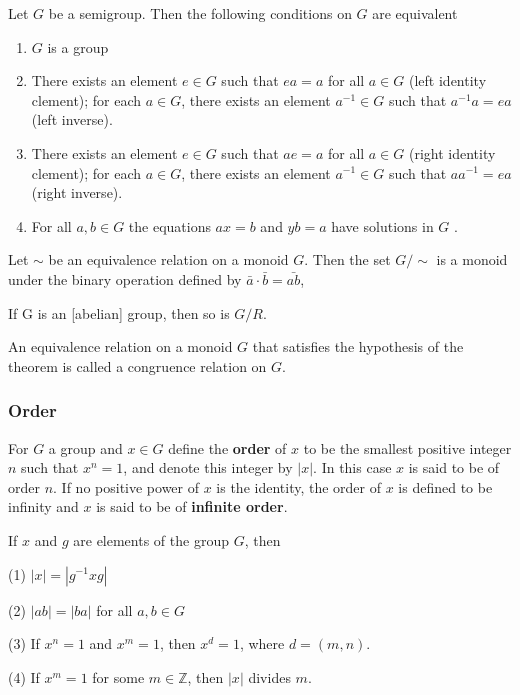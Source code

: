\begin{proposition}
    Let $G$ be a semigroup. Then the following conditions on $G$ are equivalent
    \begin{enumerate}
        \item
              $G$ is a group

        \item
              There exists an element $e \in G$ such that $ea=a$ for all $a \in G$ (left identity clement);
              for each $a \in G$, there exists an element $a^{-1} \in G$ such that $a^{-1} a=ea$ (left inverse).

        \item
              There exists an element $e \in G$ such that $ae=a$ for all $a \in G$ (right identity clement);
              for each $a \in G$, there exists an element $a^{-1} \in G$ such that $aa^{-1} =ea$ (right inverse).

        \item
              For all $a, b \in G$ the equations $ax=b$ and $yb=a$ have solutions in $G$ .
    \end{enumerate}
\end{proposition}

\begin{theorem}
    Let $\sim$ be an equivalence relation on a monoid $G$.
    Then the set $G / \sim$ is a monoid under the binary operation defined by $\bar{a}\cdot \bar{b}=\bar{ab}$,

    If G is an [abelian] group, then so is $G / R$.


    An equivalence relation on a monoid $G$ that satisfies the hypothesis of the theorem is called a congruence relation on $G$.
\end{theorem}


\subsubsection{Order}
\begin{definition}
    For $G$ a group and $x \in G$ define the \textbf{order} of $x$ to be the smallest positive integer $n$ such that $x^n=1$, and denote this integer by $|x|$. In this case $x$ is said to be of order $n$. If no positive power of $x$ is the identity, the order of $x$ is defined to be infinity and $x$ is said to be of \textbf{infinite order}.
\end{definition}
\begin{theorem}
    If $x$ and $g$ are elements of the group $G$, then

    (1) $|x|=\left|g^{-1} x g\right|$

    (2) $|a b|=|b a|$ for all $a, b \in G$

    (3) If $x^n=1$ and $x^m=1$, then $x^d=1$, where $d=(m, n)$.

    (4) If $x^m=1$ for some $m \in \mathbb{Z}$, then $\left|x\right|$ divides $m$.
\end{theorem}
